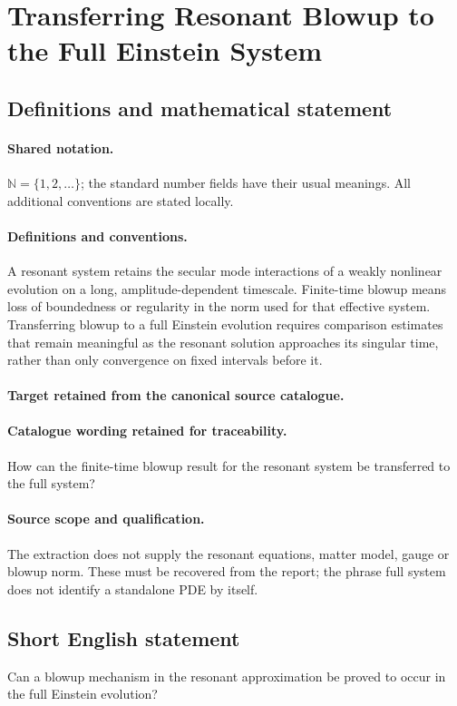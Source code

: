 \documentclass[11pt]{article}
\begin{document}
\section{Transferring Resonant Blowup to the Full Einstein System}\label{statement}

\subsection{Definitions and mathematical statement}

\paragraph{Shared notation.}$\mathbb N=\{1,2,\ldots\}$; the standard number fields have their usual meanings. All additional conventions are stated locally.


\paragraph{Definitions and conventions.}
A resonant system retains the secular mode interactions of a weakly nonlinear evolution on a long, amplitude-dependent timescale. Finite-time blowup means loss of boundedness or regularity in the norm used for that effective system. Transferring blowup to a full Einstein evolution requires comparison estimates that remain meaningful as the resonant solution approaches its singular time, rather than only convergence on fixed intervals before it.

\paragraph{Target retained from the canonical source catalogue.}
\paragraph{Catalogue wording retained for traceability.}
How can the finite-time blowup result for the resonant system be transferred to the full system?

\paragraph{Source scope and qualification.}
The extraction does not supply the resonant equations, matter model, gauge or blowup norm. These must be recovered from the report; the phrase full system does not identify a standalone PDE by itself.
\subsection{Short English statement}
Can a blowup mechanism in the resonant approximation be proved to occur in the full Einstein evolution?
\end{document}
